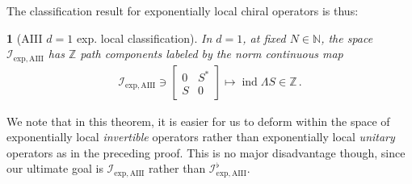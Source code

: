 \documentclass[a4paper,10pt]{article}
\numberwithin{equation}{section}
\theoremstyle{plain}
\newtheorem{thm}{\protect\theoremname}[section]
\theoremstyle{plain}
\theoremstyle{plain}
\theoremstyle{plain}
\theoremstyle{plain}
\theoremstyle{remark}
\theoremstyle{definition}
\theoremstyle{plain}
\providecommand{\theoremname}{Theorem}
\newcommand{\ZZ}{\mathbb{Z}}
\newcommand{\NN}{\mathbb{N}}
\newcommand{\calI}{\mathcal{I}}
\newcommand{\bbLambda}{\mathbb{\Lambda}}
\newcommand{\findex}{\operatorname{ind}}
\newcommand{\eq}[1]{\begin{align*}#1\end{align*}}
\begin{document}
	The classification result for exponentially local chiral operators is thus:
	\begin{thm}[AIII $d=1$ exp. local classification] In $d=1$, at fixed $N\in\NN$, the space $\calI_{\mathrm{exp,AIII}}$ has $\ZZ$ path components labeled by the norm continuous map \eq{\calI_{\mathrm{exp,AIII}}\ni \begin{bmatrix}
				0 & S^\ast\\S&0
			\end{bmatrix} \mapsto \findex \bbLambda S \in \ZZ\,. } 
	\end{thm}
	We note that in this theorem, it is easier for us to deform within the space of exponentially local \emph{invertible} operators rather than exponentially local \emph{unitary} operators as in the preceding proof. This is no major disadvantage though, since our ultimate goal is $\calI_{\mathrm{exp,AIII}}$ rather than $\calI_{\mathrm{exp,AIII}}^\flat$.
\end{document}
